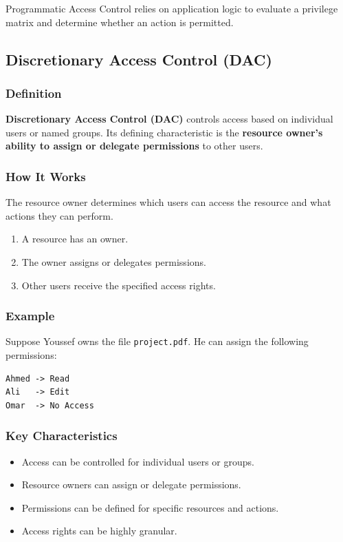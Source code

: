 \documentclass[11pt,a4paper]{article}
\begin{document}
Programmatic Access Control relies on application logic to evaluate a privilege matrix and determine whether an action is permitted.

\subsection{Discretionary Access Control (DAC)}

\subsubsection{Definition}

\textbf{Discretionary Access Control (DAC)} controls access based on individual users or named groups. Its defining characteristic is the \textbf{resource owner's ability to assign or delegate permissions} to other users.

\subsubsection{How It Works}

The resource owner determines which users can access the resource and what actions they can perform.

\begin{enumerate}
    \item A resource has an owner.
    \item The owner assigns or delegates permissions.
    \item Other users receive the specified access rights.
\end{enumerate}

\subsubsection{Example}

Suppose Youssef owns the file \texttt{project.pdf}. He can assign the following permissions:
\begin{lstlisting}
Ahmed -> Read
Ali   -> Edit
Omar  -> No Access
\end{lstlisting}

\subsubsection{Key Characteristics}

\begin{itemize}
    \item Access can be controlled for individual users or groups.
    \item Resource owners can assign or delegate permissions.
    \item Permissions can be defined for specific resources and actions.
    \item Access rights can be highly granular.
\end{itemize}
\end{document}
